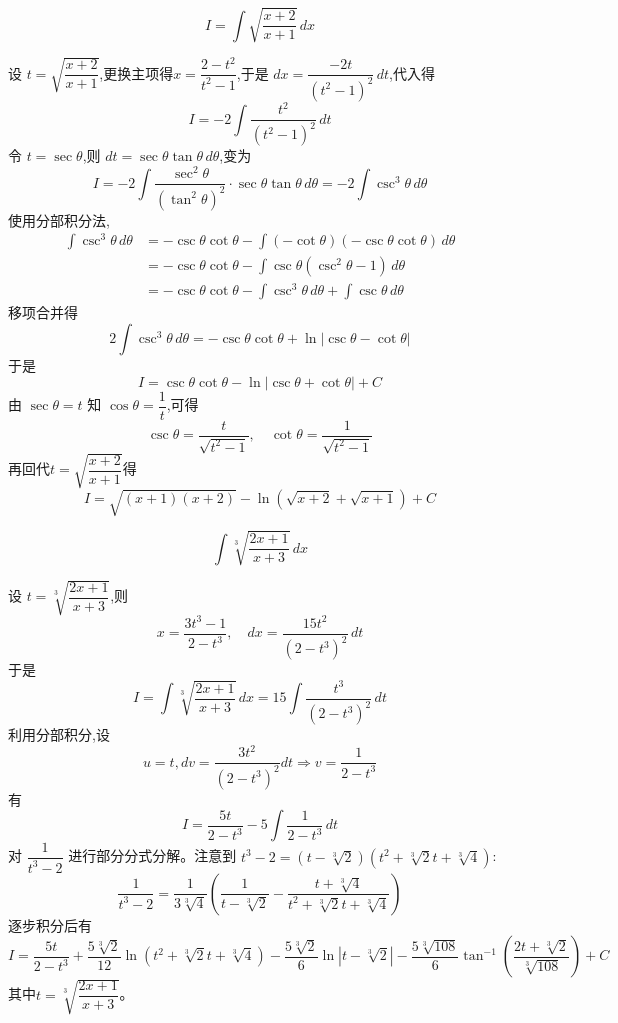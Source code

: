 \begin{questions}
    \question 
    \[
    I = \int \sqrt{\frac{x+2}{x+1}} \, dx
    \]
    \begin{solution}
        设 $t = \sqrt{\dfrac{x+2}{x+1}}$,更换主项得$x = \dfrac{2 - t^2}{t^2 - 1}$,于是 $dx = \dfrac{-2t}{(t^2-1)^2} \, dt$,代入得
        \[
        I = -2 \int \frac{t^2}{(t^2-1)^2} \, dt
        \]
        令 $t = \sec \theta$,则 $dt = \sec \theta \tan \theta \, d\theta$,变为
        \[
        I = -2 \int \frac{\sec^2 \theta}{(\tan^2 \theta)^2} \cdot \sec \theta \tan \theta \, d\theta = -2 \int \csc^3 \theta \, d\theta
        \]
        使用分部积分法,
        \begin{align*}
        \int \csc^3 \theta \, d\theta 
        &= -\csc \theta \cot \theta - \int (-\cot \theta)(-\csc \theta \cot \theta) \, d\theta \\
        &= -\csc \theta \cot \theta - \int \csc \theta (\csc^2 \theta - 1) \, d\theta \\
        &= -\csc \theta \cot \theta - \int \csc^3 \theta \, d\theta + \int \csc \theta \, d\theta
        \end{align*}
        移项合并得
        \[
        2 \int \csc^3 \theta \, d\theta = -\csc \theta \cot \theta + \ln |\csc \theta - \cot \theta|
        \]
        于是
        \[
        I = \csc \theta \cot \theta - \ln |\csc \theta + \cot \theta| + C
        \]
        由 $\sec \theta = t$ 知 $\cos \theta = \dfrac{1}{t}$,可得 
        \[
        \csc \theta = \frac{t}{\sqrt{t^2-1}},\quad \cot \theta = \frac{1}{\sqrt{t^2-1}}
        \]
        再回代$t = \sqrt{\dfrac{x+2}{x+1}}$得
        \[
        I = \sqrt{(x+1)(x+2)} - \ln(\sqrt{x+2} + \sqrt{x+1}) + C 
        \]
    \end{solution}

    \question
    \[
    \int \sqrt[3]{\frac{2x+1}{x+3}} \, dx
    \]
    \begin{solution}
        设 $t = \sqrt[3]{\dfrac{2x+1}{x+3}}$,则 
        \[
        x = \frac{3t^3-1}{2-t^3},\quad dx = \frac{15t^2}{(2-t^3)^2} \, dt
        \]
        于是
        \[
        I = \int \sqrt[3]{\frac{2x+1}{x+3}} \, dx = 15 \int \frac{t^3}{(2-t^3)^2} \, dt
        \]
        利用分部积分,设 
        \[
        u=t, dv = \frac{3t^2}{(2-t^3)^2}dt \Rightarrow v = \frac{1}{2-t^3}
        \]
        有
        \[
        I = \frac{5t}{2-t^3} - 5 \int \frac{1}{2-t^3} \, dt
        \]
        对 $\dfrac{1}{t^3-2}$ 进行部分分式分解。注意到 $t^3-2 = (t-\sqrt[3]{2})(t^2+\sqrt[3]{2}t+\sqrt[3]{4})$:
        \[
        \frac{1}{t^3-2} = \frac{1}{3\sqrt[3]{4}} \left( \frac{1}{t-\sqrt[3]{2}} - \frac{t+\sqrt[3]{4}}{t^2+\sqrt[3]{2}t+\sqrt[3]{4}} \right)
        \]
        逐步积分后有
        \[
        I = \frac{5t}{2-t^3} + \frac{5\sqrt[3]{2}}{12} \ln(t^2+\sqrt[3]{2}t+\sqrt[3]{4}) - \frac{5\sqrt[3]{2}}{6} \ln|t-\sqrt[3]{2}| - \frac{5\sqrt[3]{108}}{6} \tan^{-1}\left( \frac{2t+\sqrt[3]{2}}{\sqrt[3]{108}} \right) + C
        \]
        其中$t = \sqrt[3]{\dfrac{2x+1}{x+3}}$。
    \end{solution}


\end{questions}
